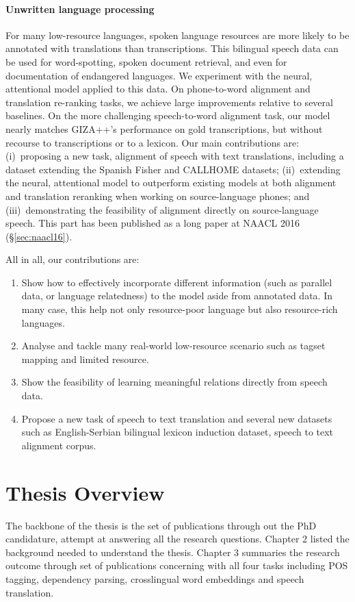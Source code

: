 \documentclass[12pt,twoside,final,hidelinks]{ltthesis}
\theoremstyle{definition}
\newcommand\naaclvi{NAACL 2016 (\S\ref{sec:naacl16})}
\begin{document}
\paragraph{Unwritten language processing} For many low-resource languages, spoken language resources are more likely to be annotated with translations than transcriptions.
This bilingual speech data can be used for word-spotting, spoken document retrieval, and even for documentation of endangered languages.
We experiment with the neural, attentional model applied to this data.
On phone-to-word alignment and translation re-ranking tasks, we achieve large improvements relative to several baselines.
On the more challenging speech-to-word alignment task, our model nearly matches GIZA++'s performance on gold transcriptions, but without recourse to transcriptions or to a lexicon.
Our main contributions are:
(i)~proposing a new task, alignment of speech with text translations, including a dataset extending the Spanish Fisher and CALLHOME datasets;
(ii)~extending the neural, attentional model to outperform existing models at both alignment and translation reranking when working on source-language phones; and
(iii)~demonstrating the feasibility of alignment directly on source-language speech. This part has been published as a long paper at \naaclvi. 

All in all, our contributions are:
\begin{enumerate}
\item Show how to effectively incorporate different information (such as parallel data, or language relatedness) to the model aside from annotated data. In many case, this help not only resource-poor language but also resource-rich languages. 
\item Analyse and tackle many real-world low-resource scenario such as tagset mapping and limited resource. 
\item Show the feasibility of learning meaningful relations directly from speech data.
\item Propose a new task of speech to text translation and several new datasets such as English-Serbian bilingual lexicon induction dataset, speech to text alignment corpus. 
\end{enumerate}

\section{Thesis Overview}
The backbone of the thesis is the set of publications through out the PhD candidature, attempt at answering all the research questions. 
Chapter 2 listed the background needed to understand the thesis. Chapter 3 summaries the research outcome 
through set of publications concerning with all four tasks including POS tagging, dependency parsing, crosslingual word embeddings and speech translation. 
\end{document}
